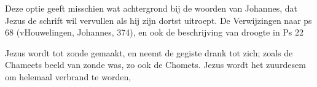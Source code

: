 \documentclass[a4paper,11pt]{article}
\begin{document}
Deze optie geeft misschien wat achtergrond bij de woorden van Johannes, dat Jezus de schrift wil vervullen als hij zijn dortst uitroept. De Verwijzingen naar ps 68 (vHouwelingen, Johannes, 374), en ook de beschrijving van droogte in Ps 22

Jezus wordt tot zonde gemaakt, en neemt de gegiste drank tot zich; zoals de Chameets beeld van zonde was, zo ook de Chomets.
Jezus wordt het zuurdesem om helemaal verbrand te worden, 






\end{document}
